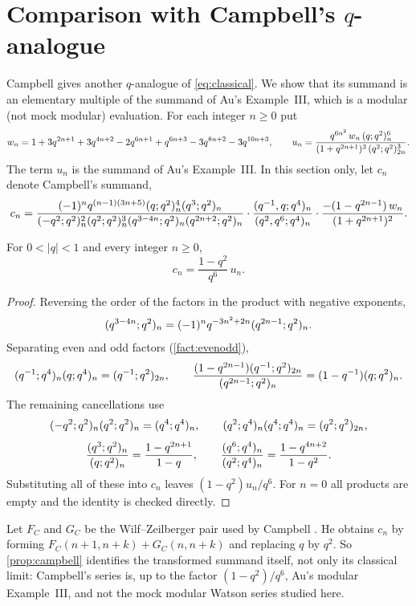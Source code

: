 \section{Comparison with Campbell's \texorpdfstring{$q$}{q}-analogue}\label{sec:campbell}

Campbell \cite[Theorem~2]{Campbell1} gives another $q$-analogue of
\eqref{eq:classical}. We show that its summand is an elementary multiple of
the summand of Au's Example~III, which is a modular (not mock modular)
evaluation. For each integer $n\ge0$ put
\[
w_n=1+3q^{2n+1}+3q^{4n+2}-2q^{6n+1}+q^{6n+3}-3q^{8n+2}-3q^{10n+3},
\qquad
u_n=\frac{q^{6n^2}\,w_n\,(q;q^2)_{n}^6}{(1+q^{2n+1})^3\,(q^2;q^2)_{2n}^3}.
\]
The term $u_n$ is the summand of Au's Example~III. In this section only, let
$c_n$ denote Campbell's summand,
\[
c_n=\frac{(-1)^nq^{(n-1)(3n+5)}(q;q^2)_{n}^4(q^3;q^2)_{n}}
{(-q^2;q^2)_{n}^2(q^2;q^2)_{n}^3(q^{3-4n};q^2)_{n}(q^{2n+2};q^2)_{n}}
\cdot\frac{(q^{-1},q;q^4)_{n}}{(q^2,q^6;q^4)_{n}}
\cdot\frac{-(1-q^{2n-1})\,w_n}{(1+q^{2n+1})^2}.
\]

\begin{proposition}\label{prop:campbell}
For $0<|q|<1$ and every integer $n\ge0$,
\[
c_n=\frac{1-q^2}{q^6}\,u_n .
\]
\end{proposition}

\begin{proof}
Reversing the order of the factors in the product with negative exponents,
\[
(q^{3-4n};q^2)_{n}=(-1)^nq^{-3n^2+2n}(q^{2n-1};q^2)_{n}.
\]
Separating even and odd factors (\cref{fact:evenodd}),
\[
(q^{-1};q^4)_{n}(q;q^4)_{n}=(q^{-1};q^2)_{2n},\qquad
\frac{(1-q^{2n-1})(q^{-1};q^2)_{2n}}{(q^{2n-1};q^2)_{n}}=(1-q^{-1})(q;q^2)_{n}.
\]
The remaining cancellations use
\[
(-q^2;q^2)_{n}(q^2;q^2)_{n}=(q^4;q^4)_{n},\qquad
(q^2;q^4)_{n}(q^4;q^4)_{n}=(q^2;q^2)_{2n},
\]
\[
\frac{(q^3;q^2)_{n}}{(q;q^2)_{n}}=\frac{1-q^{2n+1}}{1-q},\qquad
\frac{(q^6;q^4)_{n}}{(q^2;q^4)_{n}}=\frac{1-q^{4n+2}}{1-q^2}.
\]
Substituting all of these into $c_n$ leaves $(1-q^2)u_n/q^6$. For $n=0$ all
products are empty and the identity is checked directly.
\end{proof}

Let $F_C$ and $G_C$ be the Wilf--Zeilberger pair used by Campbell
\cite[(41)--(43)]{Campbell1}. He obtains $c_n$ by forming
$F_C(n+1,n+k)+G_C(n,n+k)$ and replacing $q$ by $q^2$. So
\cref{prop:campbell} identifies the transformed summand itself, not only its
classical limit: Campbell's series is, up to the factor $(1-q^2)/q^6$, Au's
modular Example~III, and not the mock modular Watson series studied here.

